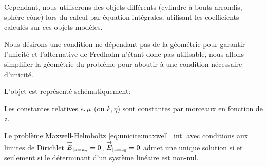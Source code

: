     Cependant, nous utiliserons des objets différents (cylindre à bouts arrondis, sphère-cône) lors du calcul par équation intégrales, utilisant les coefficients calculés sur ces objets modèles.

    Nous désirons une condition ne dépendant pas de la géométrie pour garantir l'unicité et l'alternative de Fredholm n'étant donc pas utilisable,
    nous allons simplifier la géométrie du problème pour aboutir à une condition nécessaire d'unicité.

    L'objet est représenté schématiquement:
    \begin{figure}[h!btp]
        \centering
        \begin{tikzpicture}
            
        \end{tikzpicture}
    \end{figure}

    Les constantes relatives \(\eps,\mu\) (ou \(k,\eta\)) sont constantes par morceaux en fonction de \(z\).
    \begin{prop}
      \label{prop:unicite:interieur:postulat:multi-couche}
      Le problème Maxwell-Helmholtz \eqref{eq:unicite:maxwell_int} avec conditions aux limites de Dirichlet \(\vE_{|z=z_n} = 0\), \(\vE_{|z=z_0} = 0\) admet une unique solution si et seulement si le déterminant d'un système linéaire est non-nul.
    \end{prop}

